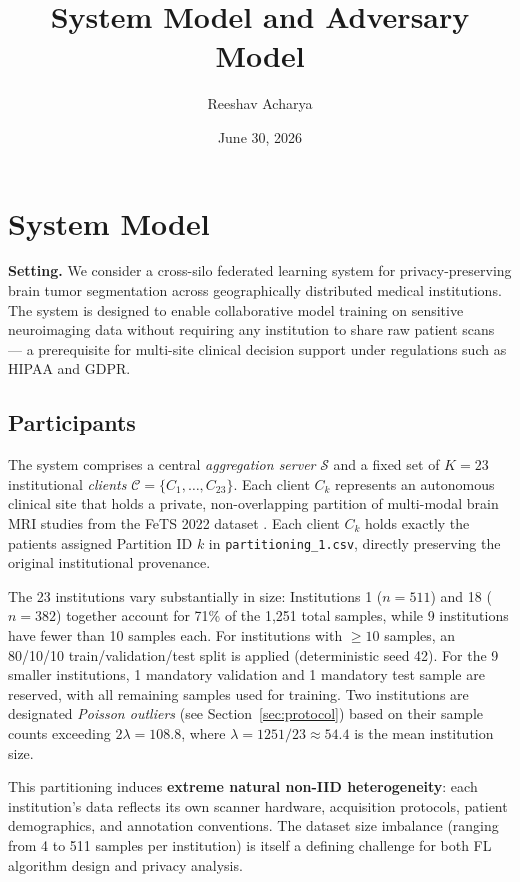 \documentclass{article}
\title{System Model and Adversary Model}
\author{Reeshav Acharya}
\date{June 30, 2026}
\begin{document}
\maketitle

\section{System Model}

\textbf{Setting.} We consider a cross-silo federated learning system for privacy-preserving brain tumor segmentation across geographically distributed medical institutions. The system is designed to enable collaborative model training on sensitive neuroimaging data without requiring any institution to share raw patient scans --- a prerequisite for multi-site clinical decision support under regulations such as HIPAA and GDPR.

\subsection{Participants}

The system comprises a central \textit{aggregation server} $\mathcal{S}$ and a fixed set of $K = 23$ institutional \textit{clients} $\mathcal{C} = \{C_1, \ldots, C_{23}\}$. Each client $C_k$ represents an autonomous clinical site that holds a private, non-overlapping partition of multi-modal brain MRI studies from the FeTS 2022 dataset \cite{pati_federated_2025}. Each client $C_k$ holds exactly the patients assigned Partition ID $k$ in \texttt{partitioning\_1.csv}, directly preserving the original institutional provenance.

The 23 institutions vary substantially in size: Institutions 1 ($n=511$) and 18 ($n=382$) together account for 71\% of the 1,251 total samples, while 9 institutions have fewer than 10 samples each. For institutions with $\geq 10$ samples, an 80/10/10 train/validation/test split is applied (deterministic seed 42). For the 9 smaller institutions, 1 mandatory validation and 1 mandatory test sample are reserved, with all remaining samples used for training. Two institutions are designated \textit{Poisson outliers} (see Section~\ref{sec:protocol}) based on their sample counts exceeding $2\lambda = 108.8$, where $\lambda = 1251/23 \approx 54.4$ is the mean institution size.

This partitioning induces \textbf{extreme natural non-IID heterogeneity}: each institution's data reflects its own scanner hardware, acquisition protocols, patient demographics, and annotation conventions. The dataset size imbalance (ranging from 4 to 511 samples per institution) is itself a defining challenge for both FL algorithm design and privacy analysis.
\end{document}
